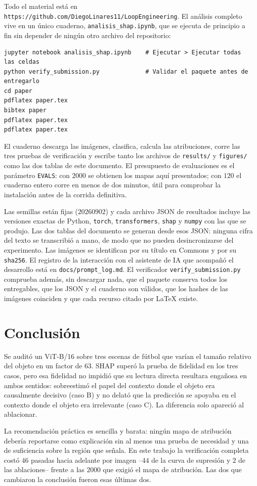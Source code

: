 \documentclass[11pt]{article}
\begin{document}
Todo el material está en \texttt{https://github.com/DiegoLinares11/LoopEngineering}.
El análisis completo vive en un único cuaderno, \texttt{analisis\_shap.ipynb}, que se
ejecuta de principio a fin sin depender de ningún otro archivo del repositorio:

\begin{verbatim}
jupyter notebook analisis_shap.ipynb    # Ejecutar > Ejecutar todas las celdas
python verify_submission.py             # Validar el paquete antes de entregarlo
cd paper
pdflatex paper.tex
bibtex paper
pdflatex paper.tex
pdflatex paper.tex
\end{verbatim}

El cuaderno descarga las imágenes, clasifica, calcula las atribuciones, corre las tres
pruebas de verificación y escribe tanto los archivos de \texttt{results/} y
\texttt{figures/} como las dos tablas de este documento. El presupuesto de evaluaciones
es el parámetro \texttt{EVALS}: con $2000$ se obtienen los mapas aquí presentados; con
$120$ el cuaderno entero corre en menos de dos minutos, útil para comprobar la
instalación antes de la corrida definitiva.

Las semillas están fijas ($20260902$) y cada archivo JSON de resultados incluye las
versiones exactas de Python, \texttt{torch}, \texttt{transformers}, \texttt{shap} y
\texttt{numpy} con las que se produjo. Las dos tablas del documento se generan desde
esos JSON: ninguna cifra del texto se transcribió a mano, de modo que no pueden
desincronizarse del experimento. Las imágenes se identifican por su título en Commons y
por su \texttt{sha256}. El registro de la interacción con el asistente de IA que
acompañó el desarrollo está en \texttt{docs/prompt\_log.md}.
El verificador \texttt{verify\_submission.py} comprueba además, sin descargar nada,
que el paquete conserva todos los entregables, que los JSON y el cuaderno son válidos,
que los hashes de las imágenes coinciden y que cada recurso citado por LaTeX existe.

\section{Conclusión}

Se auditó un ViT-B/16 sobre tres escenas de fútbol que varían el tamaño relativo del
objeto en un factor de 63. SHAP superó la prueba de fidelidad en los tres casos, pero
esa fidelidad no impidió que su lectura directa resultara engañosa en ambos sentidos:
sobreestimó el papel del contexto donde el objeto era causalmente decisivo (caso B) y
no delató que la predicción se apoyaba en el contexto donde el objeto era irrelevante
(caso C). La diferencia solo apareció al ablacionar.

La recomendación práctica es sencilla y barata: ningún mapa de atribución debería
reportarse como explicación sin al menos una prueba de necesidad y una de suficiencia
sobre la región que señala. En este trabajo la verificación completa costó $46$ pasadas
hacia adelante por imagen --$44$ de la curva de supresión y $2$ de las ablaciones--
frente a las $2000$ que exigió el mapa de atribución. Las dos que cambiaron la
conclusión fueron esas últimas dos.


\end{document}
